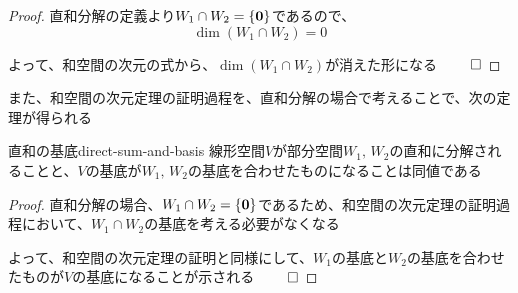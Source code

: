 \documentclass[../../../topic_linear-algebra]{subfiles}
\begin{document}
\begin{proof}
  直和分解の定義より$W_1 \cap W_2 = \{ \vb*{0} \}$であるので、
  \begin{equation*}
    \dim(W_1 \cap W_2) = 0
  \end{equation*}

  よって、和空間の次元の式から、$\dim(W_1 \cap W_2)$が消えた形になる $\qed$
\end{proof}

\sectionline

また、和空間の次元定理の証明過程を、直和分解の場合で考えることで、次の定理が得られる

\begin{theorem}{直和の基底}{direct-sum-and-basis}
  線形空間$V$が部分空間$W_1,\,W_2$の直和に分解されることと、$V$の基底が$W_1,\,W_2$の基底を合わせたものになることは同値である
\end{theorem}

\begin{proof}
  直和分解の場合、$W_1 \cap W_2 = \{ \vb*{0} \}$であるため、和空間の次元定理の証明過程において、$W_1 \cap W_2$の基底を考える必要がなくなる

  \br

  よって、和空間の次元定理の証明と同様にして、$W_1$の基底と$W_2$の基底を合わせたものが$V$の基底になることが示される $\qed$
\end{proof}
\end{document}

